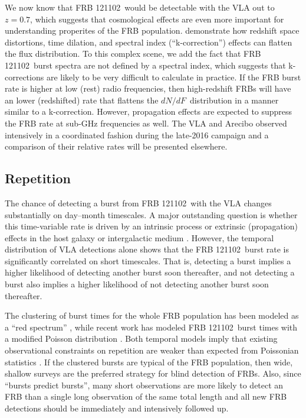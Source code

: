 \documentclass[twocolumn]{aastex61}
\newcommand{\frb}{FRB 121102}
\begin{document}
We now know that \frb\ would be detectable with the VLA out to $z=0.7$, which suggests that cosmological effects are even more important for understanding properites of the FRB population. \citet{2017arXiv170208040C} demonstrate how redshift space distortions, time dilation, and spectral index (``k-correction'') effects can flatten the flux distribution. To this complex scene, we add the fact that \frb\ burst spectra are not defined by a spectral index, which suggests that k-corrections are likely to be very difficult to calculate in practice. If the FRB burst rate is higher at low (rest) radio frequencies, then high-redshift FRBs will have an lower (redshifted) rate that flattens the $dN/dF$\ distribution in a manner similar to a k-correction. However, propagation effects are expected to suppress the FRB rate at sub-GHz frequencies \citep{2017MNRAS.465.2286R, 2017arXiv170107457C} as well. The VLA and Arecibo observed intensively in a coordinated fashion during the late-2016 campaign and a comparison of their relative rates will be presented elsewhere. 

\subsection{Repetition}

The chance of detecting a burst from \frb\ with the VLA changes substantially on day--month timescales. A major outstanding question is whether this time-variable rate is driven by an intrinsic process \citep{2016ApJ...826..226K} or extrinsic (propagation) effects in the host galaxy or intergalactic medium \citep{2017arXiv170306580C}. However, the temporal distribution of VLA detections alone shows that the \frb\ burst rate is significantly correlated on short timescales. That is, detecting a burst implies a higher likelihood of detecting another burst soon thereafter, and not detecting a burst also implies a higher likelihood of not detecting another burst soon thereafter.

The clustering of burst times for the whole FRB population has been modeled as a ``red spectrum'' \citep{2016MNRAS.458L..89C}, while recent work has modeled \frb\ burst times with a modified Poisson distribution \citep{2017arXiv170504881O}. Both temporal models imply that existing observational constraints on repetition are weaker than expected from Poissonian statistics \citep{2015MNRAS.454..457P, 2015ApJ...807...16L}. If the clustered bursts are typical of the FRB population, then wide, shallow surveys are the preferred strategy for blind detection of FRBs. Also, since ``bursts predict bursts'', many short observations are more likely to detect an FRB than a single long observation of the same total length and all new FRB detections should be immediately and intensively followed up.
\end{document}
